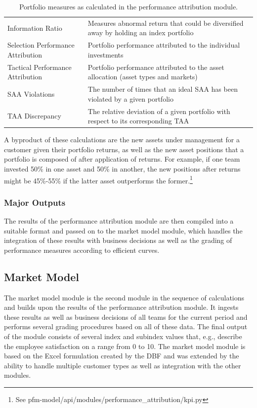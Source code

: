 \begin{table}[h!]
\begin{tabular}{lp{9cm}}
        Information Ratio                 & Measures abnormal return that could be diversified away by holding an index portfolio                       \\
        Selection Performance Attribution & Portfolio performance attributed to the individual investments                                              \\
        Tactical Performance Attribution  & Portfolio performance attributed to the asset allocation (asset types and markets)                          \\
        SAA Violations                    & The number of times that an ideal SAA has been violated by a given portfolio                                \\
        TAA Discrepancy                   & The relative deviation of a given portfolio with respect to its corresponding TAA                           \\
        \bottomrule
    \end{tabular}
    \centering
    \caption{Portfolio measures as calculated in the performance attribution module.}
    \label{table:portfolio_measures}
\end{table}

A byproduct of these calculations are the new assets under management for a customer given their portfolio returns, as well as the new asset positions that a portfolio is composed of after application of returns. For example, if one team invested 50\% in one asset and 50\% in another, the new positions after returns might be 45\%-55\% if the latter asset outperforms the former.\footnote{See pfm-model/api/modules/performance\_attribution/kpi.py}

\subsubsection{Major Outputs}
The results of the performance attribution module are then compiled into a suitable format and passed on to the market model module, which handles the integration of these results with business decisions as well as the grading of performance measures according to efficient curves.


\subsection{Market Model}
The market model module is the second module in the sequence of calculations and builds upon the results of the performance attribution module. It ingests these results as well as business decisions of all teams for the current period and performs several grading procedures based on all of these data. The final output of the module consists of several index and subindex values that, e.g., describe the employee satisfaction on a range from 0 to 10. The market model module is based on the Excel formulation created by the DBF and was extended by the ability to handle multiple customer types as well as integration with the other modules.

